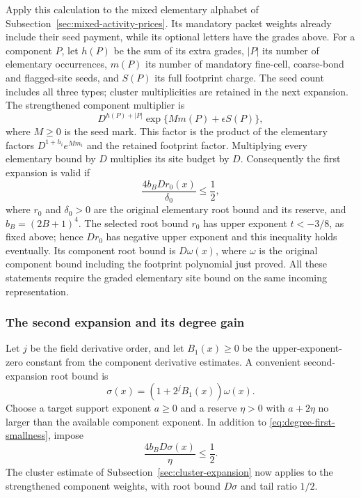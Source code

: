 Apply this calculation to the mixed elementary alphabet of
Subsection~\ref{sec:mixed-activity-prices}. Its mandatory packet weights
already include their seed payment, while its optional letters have
the grades above. For a component $P$, let $h(P)$ be the sum of its
extra grades, $|P|$ its number of elementary occurrences, $m(P)$ its
number of mandatory fine-cell, coarse-bond and flagged-site seeds, and
$S(P)$ its full footprint charge. The seed count includes all three types;
cluster multiplicities are retained in the next expansion.
The strengthened component multiplier is
\begin{equation}\label{eq:degree-component-multiplier}
 D^{h(P)+|P|}\exp\{M m(P)+\epsilon S(P)\},
\end{equation}
where $M\ge0$ is the seed mark. This factor is the product of the
elementary factors $D^{1+h_i}e^{M m_i}$ and the retained footprint
factor. Multiplying every elementary bound by $D$ multiplies its
site budget by $D$. Consequently the first expansion is valid if
\begin{equation}\label{eq:degree-first-smallness}
 \frac{4b_B D r_0(x)}{\delta_0}\le\frac12,
\end{equation}
where $r_0$ and $\delta_0>0$ are the original elementary root bound
and its reserve, and $b_B=(2B+1)^4$. The selected root bound $r_0$
has upper exponent $t<-3/8$, as fixed above; hence $Dr_0$ has
negative upper exponent and this inequality holds eventually.
Its component root bound is
$D\omega(x)$, where $\omega$ is the original component bound including
the footprint polynomial just proved. All these statements require
the graded elementary site bound on the same incoming representation.

\subsubsection{The second expansion and its degree gain}
Let $j$ be the field derivative order, and let $B_1(x)\ge0$ be the
upper-exponent-zero constant from the component derivative estimates.
A convenient second-expansion root bound is
\[
                \sigma(x)=(1+2^jB_1(x))\omega(x).
\]
Choose a target support exponent $a\ge0$ and a reserve $\eta>0$
with $a+2\eta$ no larger than the available component exponent.
In addition to \eqref{eq:degree-first-smallness}, impose
\begin{equation}\label{eq:degree-second-smallness}
                  \frac{4b_B D\sigma(x)}{\eta}\le\frac12.
\end{equation}
The cluster estimate of Subsection~\ref{sec:cluster-expansion} now
applies to the strengthened component weights, with root bound
$D\sigma$ and tail ratio $1/2$.

